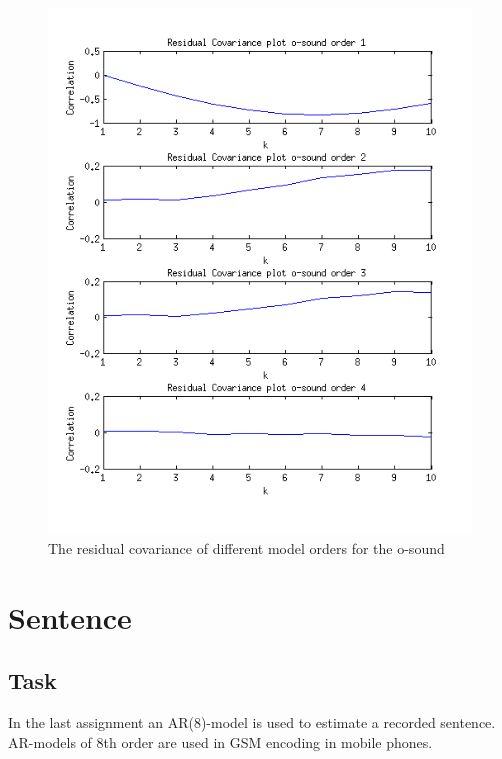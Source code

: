 \documentclass[12pt]{article}
\begin{document}
\begin{figure}[H]
  \centering
  \includegraphics[width=14cm]{residual_covariance_o.png}
  \caption{
    \label{res_cov_o}
    The residual covariance of different model orders for the o-sound}
\end{figure}

\section{Sentence}

\subsection{Task}
In the last assignment an AR(8)-model is used to estimate a recorded sentence. AR-models of 8th order are used in GSM encoding in mobile phones.
\end{document}
